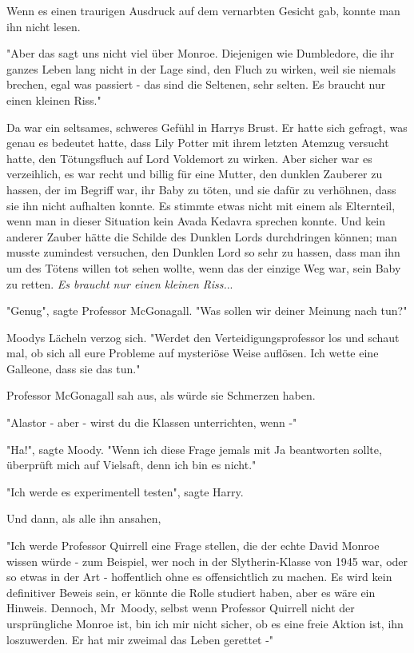 {Wenn es einen traurigen Ausdruck auf dem vernarbten Gesicht gab, konnte man ihn nicht lesen.

"Aber das sagt uns nicht viel über Monroe. Diejenigen wie Dumbledore, die ihr ganzes Leben lang nicht in der Lage sind, den Fluch zu wirken, weil sie niemals brechen, egal was passiert - das sind die Seltenen, sehr selten. Es braucht nur einen kleinen Riss."

Da war ein seltsames, schweres Gefühl in Harrys Brust. Er hatte sich gefragt, was genau es bedeutet hatte, dass Lily Potter mit ihrem letzten Atemzug versucht hatte, den Tötungsfluch auf Lord Voldemort zu wirken. Aber sicher war es verzeihlich, es war recht und billig für eine Mutter, den dunklen Zauberer zu hassen, der im Begriff war, ihr Baby zu töten, und sie dafür zu verhöhnen, dass sie ihn nicht aufhalten konnte. Es stimmte etwas nicht mit einem als Elternteil, wenn man in dieser Situation kein Avada Kedavra sprechen konnte. Und kein anderer Zauber hätte die Schilde des Dunklen Lords durchdringen können; man musste zumindest versuchen, den Dunklen Lord so sehr zu hassen, dass man ihn um des Tötens willen tot sehen wollte, wenn das der einzige Weg war, sein Baby zu retten. \emph{Es braucht nur einen kleinen Riss.}..

"Genug", sagte Professor McGonagall. "Was sollen wir deiner Meinung nach tun?"

Moodys Lächeln verzog sich. "Werdet den Verteidigungsprofessor los und schaut mal, ob sich all eure Probleme auf mysteriöse Weise auflösen. Ich wette eine Galleone, dass sie das tun."

Professor McGonagall sah aus, als würde sie Schmerzen haben.

"Alastor - aber - wirst du die Klassen unterrichten, wenn -"

"Ha!", sagte Moody. "Wenn ich diese Frage jemals mit Ja beantworten sollte, überprüft mich auf Vielsaft, denn ich bin es nicht."

"Ich werde es experimentell testen", sagte Harry.

Und dann, als alle ihn ansahen,

"Ich werde Professor Quirrell eine Frage stellen, die der echte David Monroe wissen würde - zum Beispiel, wer noch in der Slytherin-Klasse von 1945 war, oder so etwas in der Art - hoffentlich ohne es offensichtlich zu machen. Es wird kein definitiver Beweis sein, er könnte die Rolle studiert haben, aber es wäre ein Hinweis. Dennoch, Mr~Moody, selbst wenn Professor Quirrell nicht der ursprüngliche Monroe ist, bin ich mir nicht sicher, ob es eine freie Aktion ist, ihn loszuwerden. Er hat mir zweimal das Leben gerettet -"

}
